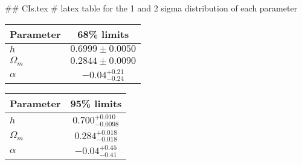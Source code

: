 ## CIs.tex
# latex table for the 1 and 2 sigma distribution of each parameter

\begin{tabular} { l  c}
 Parameter &  68\% limits\\
\hline
{\boldmath$h              $} & $0.6999\pm 0.0050          $\\
{\boldmath$\Omega_m       $} & $0.2844\pm 0.0090          $\\
{\boldmath$\alpha         $} & $-0.04^{+0.21}_{-0.24}     $\\
\hline
\end{tabular}

\begin{tabular} { l  c}
 Parameter &  95\% limits\\
\hline
{\boldmath$h              $} & $0.700^{+0.010}_{-0.0098}  $\\
{\boldmath$\Omega_m       $} & $0.284^{+0.018}_{-0.018}   $\\
{\boldmath$\alpha         $} & $-0.04^{+0.45}_{-0.41}     $\\
\hline
\end{tabular}
